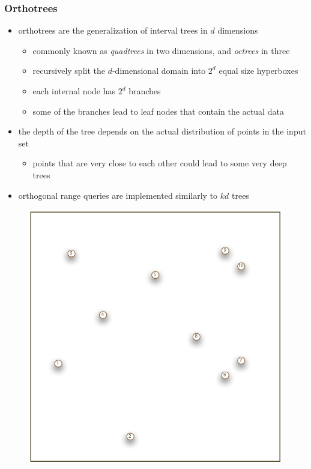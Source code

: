 \begin{frame}[fragile]
%
  \frametitle{Orthotrees}
%
  \begin{itemize}
%
  \item orthotrees are the generalization of interval trees in $d$ dimensions
    \begin{itemize}
    \item commonly known as {\em quadtrees} in two dimensions, and {\em octrees} in three
    \item recursively split the $d$-dimensional domain into $2^{d}$ equal size hyperboxes
    \item each internal node has $2^{d}$ branches
    \item some of the branches lead to leaf nodes that contain the actual data
    \end{itemize}
%
  \item the depth of the tree depends on the actual distribution of points in the input set
    \begin{itemize}
    \item points that are very close to each other could lead to some very deep trees
    \end{itemize}
%
  \item orthogonal range queries are implemented similarly to $kd$ trees
%
  \end{itemize}
%
  \begin{figure}
    \begin{minipage}{0.75\linewidth}
    \includegraphics[scale=0.2]{figures/spatial-points.pdf}

\end{minipage}
\end{figure}
\end{frame}
